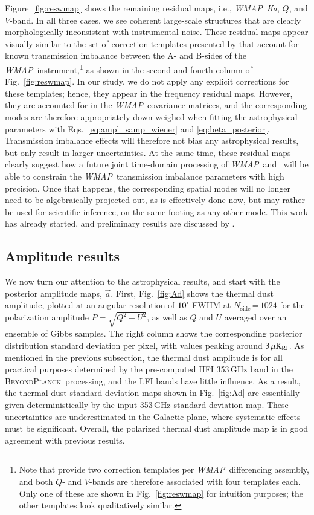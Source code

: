 \documentclass[twocolumn]{aa}
\def\WMAP{\textit{WMAP}}
\def\nside{N_{\mathrm{side}}}
\renewcommand{\a}[0]{\vec{a}}
\newcommand{\BP}{\textsc{BeyondPlanck}}
\newcommand{\?}[1]{\textcolor{red}{{\bf [#1]}}}
\begin{document}
Figure~\ref{fig:reswmap} shows the remaining residual maps, i.e.,
\WMAP\ \textit{Ka}, $Q$, and $V$-band. In all three cases, we see
coherent large-scale structures that are clearly morphologically
inconsistent with instrumental noise. These residual maps appear
visually similar to the set of correction templates presented by
\citet{jarosik2007} that account for known transmission imbalance
between the A- and B-sides of the \WMAP\ instrument,\footnote{Note
  that \citealp{jarosik2007} provide two correction templates per
  \WMAP\ differencing assembly, and both $Q$- and $V$-bands are
  therefore associated with four templates each. Only one of these are
  shown in Fig.~\ref{fig:reswmap} for intuition purposes; the other
  templates look qualitatively similar.} as shown in the second and
fourth column of Fig.~\ref{fig:reswmap}.  In our study, we do not
apply any explicit corrections for these templates; hence, they appear
in the frequency residual maps. However, they are accounted for in the
\WMAP\ covariance matrices, and the corresponding modes are therefore
appropriately down-weighed when fitting the astrophysical parameters
with Eqs.~\eqref{eq:ampl_samp_wiener} and
\eqref{eq:beta_posterior}. Transmission imbalance effects will
therefore not bias any astrophysical results, but only result in
larger uncertainties. At the same time, these residual maps clearly
suggest how a future joint time-domain processing of \WMAP\ and
\Planck\ will be able to constrain the \WMAP\ transmission imbalance
parameters with high precision. Once that happens, the corresponding
spatial modes will no longer need to be algebraically projected out,
as is effectively done now, but may rather be used for scientific
inference, on the same footing as any other mode. This work has
already started, and preliminary results are discussed by
\citet{bp17}.

\subsection{Amplitude results}



We now turn our attention to the astrophysical results, and start with
the posterior amplitude maps, $\a$. First, Fig.~\ref{fig:Ad} shows the
thermal dust amplitude, plotted at an angular resolution of
$10^\prime$ FWHM at $\nside\,$=$\,1024$ for the polarization amplitude
${P=\sqrt{Q^2+U^2}}$, as well as $Q$ and $U$ averaged over an ensemble
of Gibbs samples. The right column shows the corresponding posterior
distribution standard deviation per pixel, with values peaking around
$3\muK_{\mathrm{RJ}}$. As mentioned in the previous subsection, the
thermal dust amplitude is for all practical purposes determined by the
pre-computed HFI 353\,GHz band in the \BP\ processing, and the LFI
bands have little influence. As a result, the thermal dust standard
deviation maps shown in Fig.~\ref{fig:Ad} are essentially given
deterministically by the input 353\,GHz standard deviation
map. These uncertainties are underestimated in the Galactic
plane, where systematic effects must be significant. Overall,
the polarized thermal dust amplitude map is in good
agreement with previous results.
\end{document}

